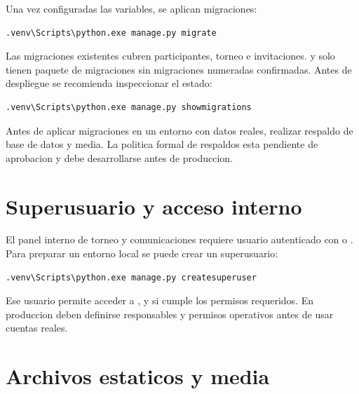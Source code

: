Una vez configuradas las variables, se aplican migraciones:

\begin{lstlisting}[language=bash,caption={Aplicacion de migraciones},label={lst:instalacion-migrate}]
.venv\Scripts\python.exe manage.py migrate
\end{lstlisting}

Las migraciones existentes cubren participantes, torneo e invitaciones.  y  solo tienen paquete de migraciones sin migraciones numeradas confirmadas. Antes de despliegue se recomienda inspeccionar el estado:

\begin{lstlisting}[language=bash,caption={Verificacion de migraciones},label={lst:instalacion-showmigrations}]
.venv\Scripts\python.exe manage.py showmigrations
\end{lstlisting}

\begin{recomendacion}
Antes de aplicar migraciones en un entorno con datos reales, realizar respaldo de base de datos y media. La politica formal de respaldos esta pendiente de aprobacion y debe desarrollarse antes de produccion.
\end{recomendacion}

\section{Superusuario y acceso interno}
\label{sec:instalacion-superusuario}

El panel interno de torneo y comunicaciones requiere usuario autenticado con  o . Para preparar un entorno local se puede crear un superusuario:

\begin{lstlisting}[language=bash,caption={Creacion de superusuario},label={lst:instalacion-superuser}]
.venv\Scripts\python.exe manage.py createsuperuser
\end{lstlisting}

Ese usuario permite acceder a ,  y  si cumple los permisos requeridos. En produccion deben definirse responsables y permisos operativos antes de usar cuentas reales.

\section{Archivos estaticos y media}
\label{sec:instalacion-static-media}

